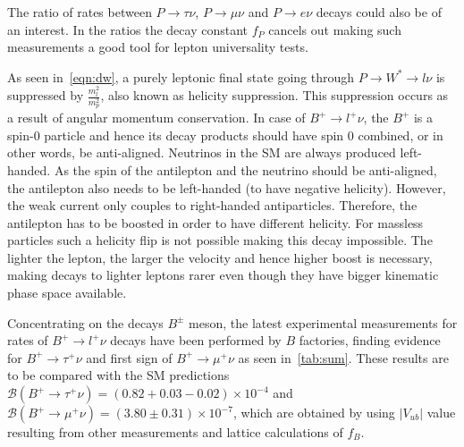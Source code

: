 The ratio of rates between $P\rightarrow\tau\nu$, $P\rightarrow\mu\nu$ and $P\rightarrow e\nu$ decays could also be of an interest. In the ratios the decay constant $f_{P}$ cancels out making such measurements a good tool for lepton universality tests.

As seen in~\autoref{eqn:dw}, a purely leptonic final state going through $P\rightarrow W^{*}\rightarrow l \nu$ is suppressed by $\frac{m^{2}_{l}}{m^{2}_{p}}$, also known as helicity suppression. This suppression occurs as a result of angular momentum conservation. In case of $B^{+}\rightarrow l^{+} \nu$, the $B^{+}$ is a spin-0 particle and hence its decay products should have spin 0 combined, or in other words, be anti-aligned. Neutrinos in the \gls{SM} are always produced left-handed. As the spin of the antilepton and the neutrino should be anti-aligned, the antilepton also needs to be left-handed (to have negative helicity). However, the weak current only couples to right-handed antiparticles. Therefore, the antilepton has to be boosted in order to have different helicity. For massless particles such a helicity flip is not possible making this decay impossible. The lighter the lepton, the larger the velocity and hence higher boost is necessary, making decays to lighter leptons rarer even though they have bigger kinematic phase space available.

Concentrating on the decays $B^{\pm}$ meson, the latest experimental measurements for rates of $B^{+}\rightarrow l^{+} \nu$ decays have been performed by $B$ factories, finding evidence for $B^{+}\rightarrow \tau^{+}\nu$ and first sign of $B^{+}\rightarrow \mu^{+}\nu$ as seen in~\autoref{tab:sum}. These results are to be compared with the \gls{SM} predictions $\mathcal{B}(B^{+}\rightarrow \tau^{+}\nu) = (0.82+0.03-0.02)\times10^{-4}$\cite{Charles:2004jd} and $\mathcal{B}(B^{+}\rightarrow \mu^{+}\nu) = (3.80\pm0.31)\times10^{-7}$\cite{Sibidanov:2017vph}, which are obtained by using $|V_{ub}|$ value resulting from other measurements and lattice calculations of $f_{B}$. %



